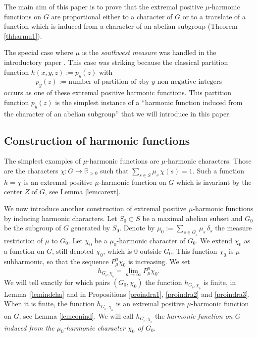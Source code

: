 \documentclass[JEP,XML,SOM,Unicode]{cedram}
\theoremstyle{definition}
\newcommand{\m}[1]{\mathbb{ #1}}
\let\de\delta
\let\ra\to
\begin{document}
The main aim of this paper is to prove
that the extremal positive $\mu$-harmonic functions
on $G$ are proportional
either to a character of $G$ or to a translate of a function which is induced
from a character of an abelian subgroup (Theorem \ref{thharmu1}).

The special case
where $\mu$ is the {\it southwest measure} was handled in
the introductory paper
\cite{BenoistHeisenberg1}.
This case was striking because the classical partition
function $h(x,y,z):=p_y(z)$ with
\[
p_y(z):=
\text{number of partition of $z$
by $y$ non-negative integers}
\]
occurs as one of these extremal
positive harmonic functions.
This partition function $p_y(z)$ is the simplest instance
of a ``harmonic function induced
from the character of an abelian subgroup''
that we will introduce in this paper.

\subsection{Construction of harmonic functions}
\label{secincoha}
The simplest examples of $\mu$-harmonic functions are $\mu$-harmonic characters.
Those are the
characters
$\chi: G\ra \m R_{>0}$ such that $\sum_{s\in S}\mu_s\,\chi(s)=1$.
Such a function
$h=\chi$ is an
extremal positive $\mu$-harmonic function on $G$ which is invariant by the center $Z$ of $G$,
see Lemma \ref{lemcarext}.

We now introduce another construction of extremal positive $\mu$-harmonic functions
by inducing harmonic characters.
Let $S_0\subset S$ be a maximal abelian subset and $G_0$
be the subgroup of $G$ generated by $S_0$. Denote by
$\mu_{0}:=\sum_{s\in G_{_0}}\mu_s\, \de_s$
the measure restriction of $\mu$ to $G_0$.
Let $\chi_0$ be a $\mu_{0}$-harmonic character of $G_{0}$.
We extend $\chi_0$ as a function on $G$,
still denoted $\chi_0$,
which is $0$ outside $G_{0}$. This function $\chi_0$ is
$\mu$\nobreakdash-subharmonic, so that the sequence $P_\mu^n\chi_0$
is increasing. We set
\[
h_{G_{_0},\chi_{_0}}=\lim_{n\ra\infty}P_\mu^n\chi_0.
\]
We will tell exactly for which pairs $(G_0,\chi_0)$
the function $h_{G_{_0},\chi_{_0}}$ is finite,
in Lemma~\ref{lemindcha} and in
Propositions \ref{proindra1}, \ref{proindra2} and \ref{proindra3}.
When it is finite, the function $h_{G_{_0},\chi_{_0}}$
is an
extremal positive $\mu$-harmonic function on $G$,
see Lemma \ref{lemconind}.
We will call $h_{G_{_0},\chi_{_0}}$
the \emph{harmonic function on $G$
induced from the $\mu_0$-harmonic character $\chi_0$ of $G_0$}.
\end{document}
